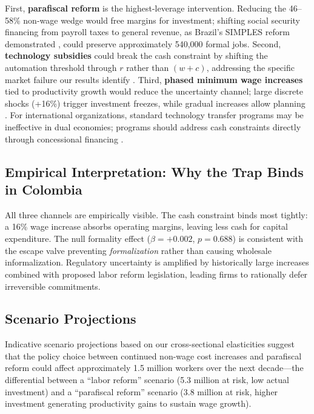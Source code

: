 \documentclass[5p,times,authoryear]{elsarticle}
\begin{document}
First, \textbf{parafiscal reform} is the highest-leverage intervention. Reducing the 46--58\% non-wage wedge would free margins for investment; shifting social security financing from payroll taxes to general revenue, as Brazil's SIMPLES reform demonstrated \citep{fajnzylber2011formality, levy2008good}, could preserve approximately 540,000 formal jobs. Second, \textbf{technology subsidies} could break the cash constraint by shifting the automation threshold through $r$ rather than $(w + c)$, addressing the specific market failure our results identify \citep{crespi2014rethinking}. Third, \textbf{phased minimum wage increases} tied to productivity growth would reduce the uncertainty channel; large discrete shocks (+16\%) trigger investment freezes, while gradual increases allow planning \citep{aterido2011big}. For international organizations, standard technology transfer programs may be ineffective in dual economies; programs should address cash constraints directly through concessional financing \citep{korinek2021ai, hallward2018trouble}.

\subsection{Empirical Interpretation: Why the Trap Binds in Colombia}
\label{subsec:discussion_trap}

All three channels are empirically visible. The cash constraint binds most tightly: a 16\% wage increase absorbs operating margins, leaving less cash for capital expenditure. The null formality effect ($\hat{\beta} = +0.002$, $p = 0.688$) is consistent with the escape valve preventing \emph{formalization} rather than causing wholesale informalization. Regulatory uncertainty is amplified by historically large increases combined with proposed labor reform legislation, leading firms to rationally defer irreversible commitments.

\subsection{Scenario Projections}
\label{subsec:scenarios}

Indicative scenario projections based on our cross-sectional elasticities suggest that the policy choice between continued non-wage cost increases and parafiscal reform could affect approximately 1.5 million workers over the next decade---the differential between a ``labor reform'' scenario (5.3 million at risk, low actual investment) and a ``parafiscal reform'' scenario (3.8 million at risk, higher investment generating productivity gains to sustain wage growth).
\end{document}
